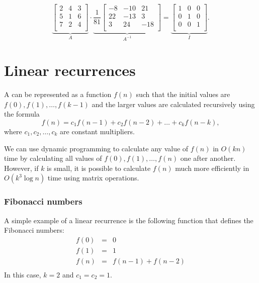 \[
\underbrace{
 \begin{bmatrix}
  2 & 4 & 3\\
  5 & 1 & 6\\
  7 & 2 & 4\\
 \end{bmatrix}
}_{A}
\cdot
\underbrace{
 \frac{1}{81}
 \begin{bmatrix}
   -8 & -10 & 21 \\
   22 & -13 & 3 \\
   3 & 24 & -18 \\
 \end{bmatrix}
}_{A^{-1}}
=
\underbrace{
 \begin{bmatrix}
  1 & 0 & 0 \\
  0 & 1 & 0 \\
  0 & 0 & 1 \\
 \end{bmatrix}
}_{I}.
\]

\section{Linear recurrences}


A 
can be represented as a function $f(n)$
such that the initial values are
$f(0),f(1),\ldots,f(k-1)$
and the larger values
are calculated recursively using the formula
\[f(n) = c_1 f(n-1) + c_2 f(n-2) + \ldots + c_k f (n-k),\]
where $c_1,c_2,\ldots,c_k$ are constant multipliers.

We can use dynamic programming to calculate
any value of $f(n)$ in $O(kn)$ time by calculating
all values of $f(0),f(1),\ldots,f(n)$ one after another.
However, if $k$ is small, it is possible to calculate
$f(n)$ much more efficiently in $O(k^3 \log n)$
time using matrix operations.

\subsubsection{Fibonacci numbers}


A simple example of a linear recurrence is the
following function that defines the Fibonacci numbers:
\[
\begin{array}{lcl}
f(0) & = & 0 \\
f(1) & = & 1 \\
f(n) & = & f(n-1)+f(n-2) \\
\end{array}
\]
In this case, $k=2$ and $c_1=c_2=1$.

